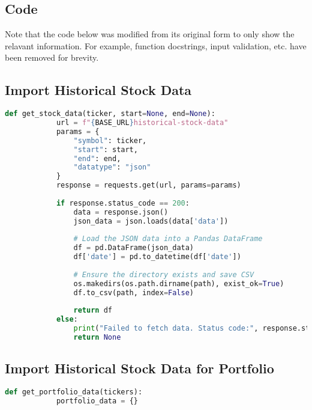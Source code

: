 \documentclass{article}
\begin{document}
\begin{appendices}
    
    \section{Code}
    
    Note that the code below was modified from its original form to only show the relavant information. For example, function docstrings, input validation, etc. have been removed for brevity.
    
    \subsection{Import Historical Stock Data}
    
    \begin{lstlisting}[language=Python]
        def get_stock_data(ticker, start=None, end=None):    
            url = f"{BASE_URL}historical-stock-data"
            params = {
                "symbol": ticker,
                "start": start,
                "end": end,
                "datatype": "json"
            }
            response = requests.get(url, params=params)
    
            if response.status_code == 200:
                data = response.json()  
                json_data = json.loads(data['data'])
            
                # Load the JSON data into a Pandas DataFrame
                df = pd.DataFrame(json_data) 
                df['date'] = pd.to_datetime(df['date'])
                
                # Ensure the directory exists and save CSV
                os.makedirs(os.path.dirname(path), exist_ok=True)
                df.to_csv(path, index=False)
    
                return df
            else:
                print("Failed to fetch data. Status code:", response.status_code)
                return None
    \end{lstlisting}
    
    \subsection{Import Historical Stock Data for Portfolio}
    
    \begin{lstlisting}[language=Python]
        def get_portfolio_data(tickers):
            portfolio_data = {}
            

\end{lstlisting}
\end{appendices}
\end{document}
